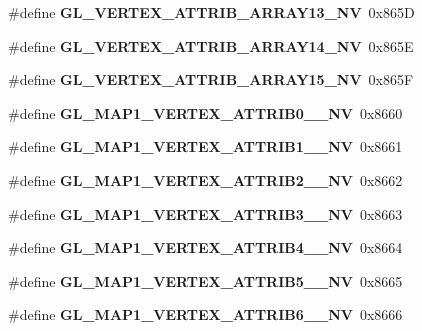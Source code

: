 \begin{DoxyCompactItemize}
\item 
\#define {\bfseries G\+L\+\_\+\+V\+E\+R\+T\+E\+X\+\_\+\+A\+T\+T\+R\+I\+B\+\_\+\+A\+R\+R\+A\+Y13\+\_\+\+N\+V}~0x865\+D\label{_s_d_l__opengl_8h_a99c532c7dc8bccb897f0ecdfe947ad78}

\item 
\#define {\bfseries G\+L\+\_\+\+V\+E\+R\+T\+E\+X\+\_\+\+A\+T\+T\+R\+I\+B\+\_\+\+A\+R\+R\+A\+Y14\+\_\+\+N\+V}~0x865\+E\label{_s_d_l__opengl_8h_a6fcd9def4174b7bf966ee3b5facc2dc7}

\item 
\#define {\bfseries G\+L\+\_\+\+V\+E\+R\+T\+E\+X\+\_\+\+A\+T\+T\+R\+I\+B\+\_\+\+A\+R\+R\+A\+Y15\+\_\+\+N\+V}~0x865\+F\label{_s_d_l__opengl_8h_a2bacb7d23f1cefe799a75fc18f003617}

\item 
\#define {\bfseries G\+L\+\_\+\+M\+A\+P1\+\_\+\+V\+E\+R\+T\+E\+X\+\_\+\+A\+T\+T\+R\+I\+B0\+\_\+\_\+\+N\+V}~0x8660\label{_s_d_l__opengl_8h_a8039e0f59b39f98409db8f488e0dfe2c}

\item 
\#define {\bfseries G\+L\+\_\+\+M\+A\+P1\+\_\+\+V\+E\+R\+T\+E\+X\+\_\+\+A\+T\+T\+R\+I\+B1\+\_\+\_\+\+N\+V}~0x8661\label{_s_d_l__opengl_8h_ab215283c4126aa7da1bb825f6a9e0069}

\item 
\#define {\bfseries G\+L\+\_\+\+M\+A\+P1\+\_\+\+V\+E\+R\+T\+E\+X\+\_\+\+A\+T\+T\+R\+I\+B2\+\_\+\_\+\+N\+V}~0x8662\label{_s_d_l__opengl_8h_a65a09724705239db031d852081f678cf}

\item 
\#define {\bfseries G\+L\+\_\+\+M\+A\+P1\+\_\+\+V\+E\+R\+T\+E\+X\+\_\+\+A\+T\+T\+R\+I\+B3\+\_\+\_\+\+N\+V}~0x8663\label{_s_d_l__opengl_8h_a0aea5c4cc61c0feaea7e4e86dc422439}

\item 
\#define {\bfseries G\+L\+\_\+\+M\+A\+P1\+\_\+\+V\+E\+R\+T\+E\+X\+\_\+\+A\+T\+T\+R\+I\+B4\+\_\+\_\+\+N\+V}~0x8664\label{_s_d_l__opengl_8h_acf8df6fe5fa1f71dfb42b1b793821b26}

\item 
\#define {\bfseries G\+L\+\_\+\+M\+A\+P1\+\_\+\+V\+E\+R\+T\+E\+X\+\_\+\+A\+T\+T\+R\+I\+B5\+\_\+\_\+\+N\+V}~0x8665\label{_s_d_l__opengl_8h_ae139967363da4a568386b34dbf6f47cb}

\item 
\#define {\bfseries G\+L\+\_\+\+M\+A\+P1\+\_\+\+V\+E\+R\+T\+E\+X\+\_\+\+A\+T\+T\+R\+I\+B6\+\_\+\_\+\+N\+V}~0x8666\label{_s_d_l__opengl_8h_ac420ae69bbe481ae1c249889b18fc86e}


\end{DoxyCompactItemize}
